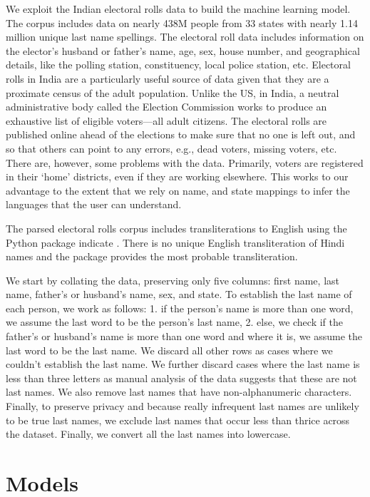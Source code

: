 \documentclass[11pt,  letterpaper]{article}
\begin{document}
We exploit the Indian electoral rolls data \citep{DVN/OG47IV_2023, DVN/MUEGDT_2018} to build the machine learning model. The corpus includes data on nearly 438M people from 33 states with nearly 1.14 million unique last name spellings. The electoral roll data includes information on the elector's husband or father’s name, age, sex, house number, and geographical details, like the polling station, constituency, local police station, etc. Electoral rolls in India are a particularly useful source of data given that they are a proximate census of the adult population. Unlike the US, in India, a neutral administrative body called the Election Commission works to produce an exhaustive list of eligible voters—all adult citizens. The electoral rolls are published online ahead of the elections to make sure that no one is left out, and so that others can point to any errors, e.g., dead voters, missing voters, etc. There are, however, some problems with the data. Primarily, voters are registered in their `home' districts, even if they are working elsewhere. This works to our advantage to the extent that we rely on name, and state mappings to infer the languages that the user can understand.

The parsed electoral rolls corpus \citep{DVN/MUEGDT_2018} includes transliterations to English using the Python package indicate \citep{Chintalapati_Indicate_Transliterate_Indic_2022}. There is no unique English transliteration of Hindi names and the package provides the most probable transliteration. 

We start by collating the data, preserving only five columns: first name, last name, father's or husband's name, sex, and state. To establish the last name of each person, we work as follows: 1. if the person's name is more than one word, we assume the last word to be the person's last name, 2. else, we check if the father's or husband's name is more than one word and where it is, we assume the last word to be the last name. We discard all other rows as cases where we couldn't establish the last name. We further discard cases where the last name is less than three letters as manual analysis of the data suggests that these are not last names. We also remove last names that have non-alphanumeric characters. Finally, to preserve privacy and because really infrequent last names are unlikely to be true last names, we exclude last names that occur less than thrice across the dataset. Finally, we convert all the last names into lowercase. 

\section{Models}
\end{document}
